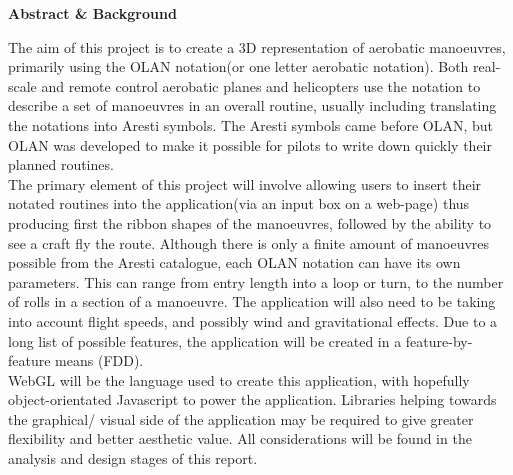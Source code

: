 \thispagestyle{empty}

\begin{center}
{\LARGE\bf Abstract \& Background}
\end{center}

The aim of this project is to create a 3D representation of aerobatic manoeuvres, primarily using the OLAN notation(or one letter aerobatic notation). Both real-scale and remote control aerobatic planes and helicopters use the notation to describe a set of manoeuvres in an overall routine, usually including translating the notations into Aresti symbols. The Aresti symbols came before OLAN, but OLAN was developed to make it possible for pilots to write down quickly their planned routines.\\
The primary element of this project will involve allowing users to insert their notated routines into the application(via an input box on a web-page) thus producing first the ribbon shapes of the manoeuvres, followed by the ability to see a craft fly the route. Although there is only a finite amount of manoeuvres possible from the Aresti catalogue, each OLAN notation can have its own parameters. This can range from entry length into a loop or turn, to the number of rolls in a section of a manoeuvre. The application will also need to be taking into account flight speeds, and possibly wind and gravitational effects. Due to a long list of possible features, the application will be created in a feature-by-feature means (FDD).\\
WebGL will be the language used to create this application, with hopefully object-orientated Javascript to power the application. Libraries helping towards the graphical/ visual side of the application may be required to give greater flexibility and better aesthetic value. All considerations will be found in the analysis and design stages of this report.